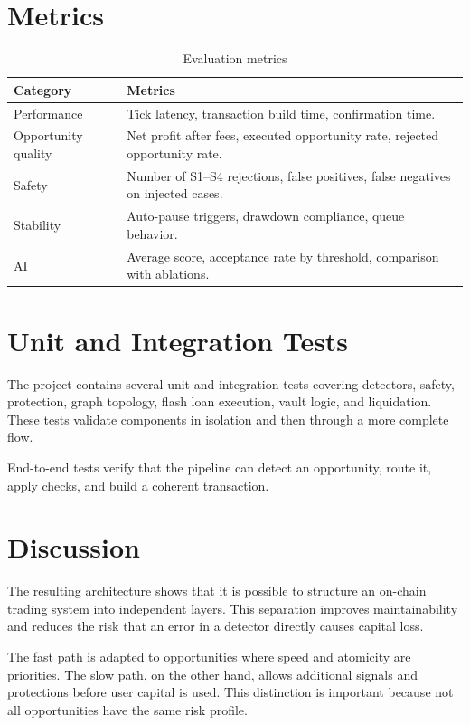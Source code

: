 \documentclass[12pt,a4paper]{report}
\begin{document}
\section{Metrics}

\begin{table}[H]
\centering
\begin{tabularx}{\textwidth}{lX}
\toprule
\textbf{Category} & \textbf{Metrics} \\
\midrule
Performance & Tick latency, transaction build time, confirmation time. \\
Opportunity quality & Net profit after fees, executed opportunity rate, rejected opportunity rate. \\
Safety & Number of S1--S4 rejections, false positives, false negatives on injected cases. \\
Stability & Auto-pause triggers, drawdown compliance, queue behavior. \\
AI & Average score, acceptance rate by threshold, comparison with ablations. \\
\bottomrule
\end{tabularx}
\caption{Evaluation metrics}
\end{table}

\section{Unit and Integration Tests}

The project contains several unit and integration tests covering detectors, safety, protection, graph topology, flash loan execution, vault logic, and liquidation. These tests validate components in isolation and then through a more complete flow.

End-to-end tests verify that the pipeline can detect an opportunity, route it, apply checks, and build a coherent transaction.

\section{Discussion}

The resulting architecture shows that it is possible to structure an on-chain trading system into independent layers. This separation improves maintainability and reduces the risk that an error in a detector directly causes capital loss.

The fast path is adapted to opportunities where speed and atomicity are priorities. The slow path, on the other hand, allows additional signals and protections before user capital is used. This distinction is important because not all opportunities have the same risk profile.
\end{document}
